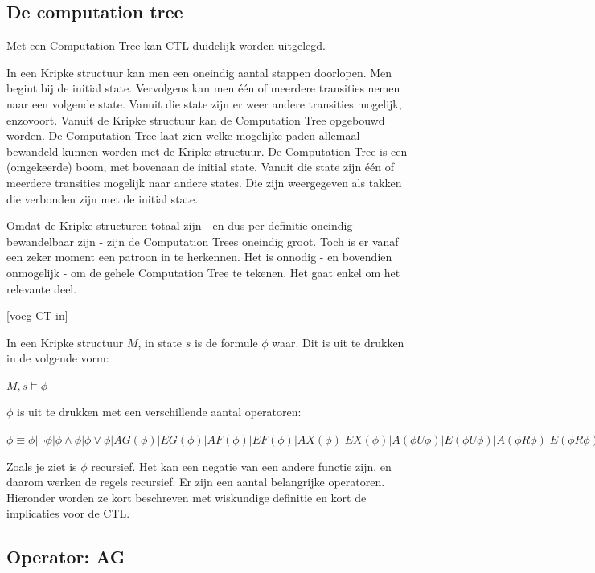 \documentclass{article}
\begin{document}
		\subsection{De computation tree}
		
		Met een Computation Tree kan CTL duidelijk worden uitgelegd. 

		In een Kripke structuur kan men een oneindig aantal stappen doorlopen. Men begint bij de initial state. Vervolgens kan men één of meerdere transities nemen naar een volgende state. Vanuit die state zijn er weer andere transities mogelijk, enzovoort. Vanuit de Kripke structuur kan de Computation Tree opgebouwd worden. De Computation Tree laat zien welke mogelijke paden allemaal bewandeld kunnen worden met de Kripke structuur. De Computation Tree is een (omgekeerde) boom, met bovenaan de initial state. Vanuit die state zijn één of meerdere transities mogelijk naar andere states. Die zijn weergegeven als takken die verbonden zijn met de initial state.
		
		Omdat de Kripke structuren totaal zijn - en dus per definitie oneindig bewandelbaar zijn - zijn de Computation Trees oneindig groot. Toch is er vanaf een zeker moment een patroon in te herkennen. Het is onnodig - en bovendien onmogelijk - om de gehele Computation Tree te tekenen. Het gaat enkel om het relevante deel.

		[voeg CT in]

		In een Kripke structuur \( M \), in state \( s \) is de formule \( \phi \) waar. Dit is uit te drukken in de volgende vorm:

		\( M, s \models \phi \)

		\( \phi \) is uit te drukken met een verschillende aantal operatoren:

		\( \phi \equiv \phi | \neg \phi | \phi \land \phi | \phi \lor \phi | AG(\phi) | EG(\phi) | AF(\phi) | EF(\phi) | AX(\phi) | EX(\phi) | A(\phi U \phi) | E(\phi U \phi) | A (\phi R \phi) | E(\phi R \phi) \)

		Zoals je ziet is \( \phi \) recursief. Het kan een negatie van een andere functie zijn, en daarom werken de regels recursief. Er zijn een aantal belangrijke operatoren. Hieronder worden ze kort beschreven met wiskundige definitie en kort de implicaties voor de CTL.
		
		\subsection{Operator: AG}
				
\end{document}
